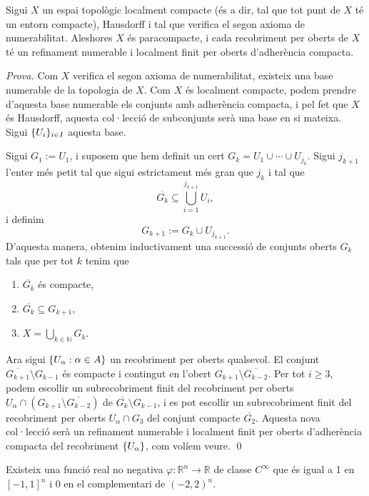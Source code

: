 \begin{lema}\label{lema:paracompact}
    Sigui $X$ un espai topològic localment compacte (és a dir, tal que tot punt de $X$ té un entorn compacte), Hausdorff i tal que verifica el segon axioma de numerabilitat. Aleshores $X$ és paracompacte, i cada recobriment per oberts de $X$ té un refinament numerable i localment finit per oberts d'adherència compacta.
\end{lema}
{\color{green!50!black} 
    \textit{Prova.} 
    Com $X$ verifica el segon axioma de numerabilitat, existeix una base numerable de la topologia de $X$. Com $X$ és localment compacte, podem prendre d'aquesta base numerable els conjunts amb adherència compacta, i pel fet que $X$ és Hausdorff, aquesta col·lecció de subconjunts serà una base en si mateixa. Sigui $\{U_i\}_{i\in I}$ aquesta base.

    Sigui $G_1 := U_1$, i suposem que hem definit un cert $G_k=U_1\cup\cdots\cup U_{j_k}$. Sigui $j_{k+1}$ l'enter més petit tal que sigui estrictament més gran que $j_k$ i tal que 
    \begin{equation*}
        \overline{G_k}\subseteq \bigcup_{i = 1}^{j_{k+1}} U_i,
    \end{equation*}
    i definim 
    \begin{equation*}
        G_{k+1} := G_k\cup U_{j_{k+1}}.
    \end{equation*}
    D'aquesta manera, obtenim inductivament una successió de conjunts oberts $G_k$ tals que per tot $k$ tenim que
    \begin{enumerate}
        \item $\overline{G_k}$ és compacte,
        \item $\overline{G_k}\subseteq G_{k+1}$,
        \item $X = \bigcup_{k\in\mathbb N} G_k$.
    \end{enumerate}
    Ara sigui $\{U_\alpha:\alpha\in A\}$ un recobriment per oberts qualsevol. El conjunt $\overline{G_{k+1}}\setminus G_{k-1}$ és compacte i contingut en l'obert $G_{k+1}\setminus \overline{G_{k-2}}$. Per tot $i\ge3$, podem escollir un subrecobriment finit del recobriment per oberts $U_\alpha\cap(G_{k+1}\setminus \overline{G_{k-2}})$ de $\overline{G_k}\setminus G_{k-1}$, i es pot escollir un subrecobriment finit del recobriment per oberts $U_\alpha\cap G_3$ del conjunt compacte $\overline{G_2}$. Aquesta nova col·lecció serà un refinament numerable i localment finit per oberts d'adherència compacta del recobriment $\{U_\alpha\}$, com volíem veure. \qed
}
\begin{lema}\label{lema:bump}
    Existeix una funció real no negativa $\varphi:\mathbb R^n\to\mathbb R$ de classe $C^\infty$ que és igual a 1 en $[-1,1]^n$ i $0$ en el complementari de $(-2,2)^n$.
\end{lema}

